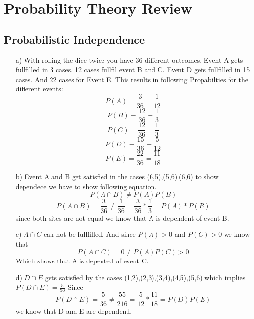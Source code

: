 \documentclass{article}
\begin{document}
\section{Probability Theory Review}
\subsection{Probabilistic Independence}
\begin{itemize}
	\item[a)]
	With rolling the dice twice you have 36 different outcomes. Event A gets fullfilled in 3 cases. 12 cases fullfil event B and C. Event D gets fullfilled in 15 cases. And 22 cases for Event E.
	This results in following Propabilties for the different events:
	$$P(A) = \frac{3}{36}=\frac{1}{12}$$$$P(B) =\frac{12}{36}=\frac{1}{3}$$$$ P(C) = \frac{12}{36}=\frac{1}{3}$$$$P(D) = \frac{15}{36}=\frac{5}{12}$$$$P(E) = \frac{22}{36}=\frac{11}{18}$$ 
	\item[b)] Event A and B get satisfied in the cases (6,5),(5,6),(6,6) to show dependece we have to show following equation.
	$$P(A \cap B) \neq P(A)P(B)$$
	$$P(A \cap B)=\frac{3}{36} \neq \frac{1}{36} = \frac{3}{36}*\frac{1}{3} = P(A) * P(B)$$
	since both sites are not equal we know that A is dependent of event B.
	\item[c)]
	$A\cap C$ can not be fullfilled. And since $P(A)>0$ and $P(C)>0$ we know that
	$$P(A\cap C) = 0 \neq P(A)P(C)>0$$
	Which shows that A is depented of event C.
	\item[d)]
	$D\cap E$ gets satisfied by the cases (1,2),(2,3),(3,4),(4,5),(5,6) which implies $P(D\cap E)=\frac{5}{36}$
	Since $$P(D\cap E) = \frac{5}{36} \neq \frac{55}{216}=\frac{5}{12}*\frac{11}{18} = P(D)P(E)$$ we know that D and E are dependend.
\end{itemize}
\end{document}
